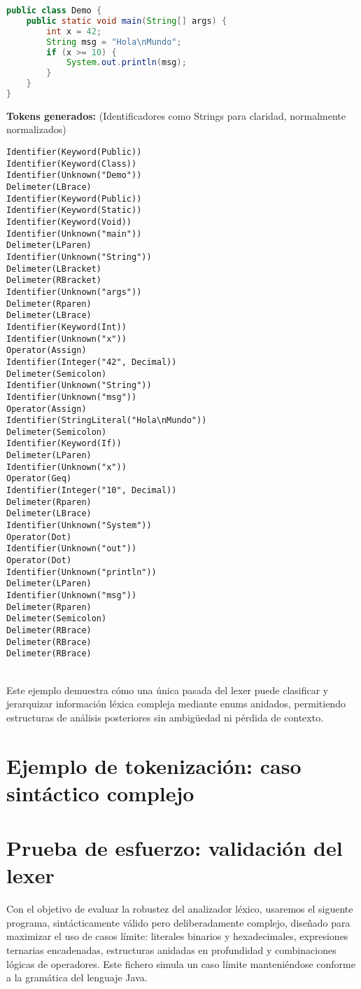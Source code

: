 \documentclass{article}
\begin{document}
\begin{lstlisting}[language=Java, caption=Demo.java - Fragmento simple con riqueza léxica]
public class Demo {
	public static void main(String[] args) {
		int x = 42;
		String msg = "Hola\nMundo";
		if (x >= 10) {
			System.out.println(msg);
		}
	}
}
\end{lstlisting}
\newpage{}
\noindent \textbf{Tokens generados:} \hfill (Identificadores como Strings para claridad, normalmente normalizados)

\begin{verbatim}
Identifier(Keyword(Public))
Identifier(Keyword(Class))
Identifier(Unknown("Demo"))
Delimeter(LBrace)
Identifier(Keyword(Public))
Identifier(Keyword(Static))
Identifier(Keyword(Void))
Identifier(Unknown("main"))
Delimeter(LParen)
Identifier(Unknown("String"))
Delimeter(LBracket)
Delimeter(RBracket)
Identifier(Unknown("args"))
Delimeter(Rparen)
Delimeter(LBrace)
Identifier(Keyword(Int))
Identifier(Unknown("x"))
Operator(Assign)
Identifier(Integer("42", Decimal))
Delimeter(Semicolon)
Identifier(Unknown("String"))
Identifier(Unknown("msg"))
Operator(Assign)
Identifier(StringLiteral("Hola\nMundo"))
Delimeter(Semicolon)
Identifier(Keyword(If))
Delimeter(LParen)
Identifier(Unknown("x"))
Operator(Geq)
Identifier(Integer("10", Decimal))
Delimeter(Rparen)
Delimeter(LBrace)
Identifier(Unknown("System"))
Operator(Dot)
Identifier(Unknown("out"))
Operator(Dot)
Identifier(Unknown("println"))
Delimeter(LParen)
Identifier(Unknown("msg"))
Delimeter(Rparen)
Delimeter(Semicolon)
Delimeter(RBrace)
Delimeter(RBrace)
Delimeter(RBrace)
\end{verbatim}
\\
Este ejemplo demuestra cómo una única pasada del lexer puede clasificar y jerarquizar información léxica compleja mediante enums anidados, permitiendo estructuras de análisis posteriores sin ambigüedad ni pérdida de contexto.

\newpage{}
\section*{Ejemplo de tokenización: caso sintáctico complejo}

\section*{Prueba de esfuerzo: validación del lexer}

Con el objetivo de evaluar la robustez del analizador léxico, usaremos el siguente programa, sintácticamente válido pero deliberadamente complejo, diseñado para maximizar el uso de casos límite: literales binarios y hexadecimales, expresiones ternarias encadenadas, estructuras anidadas en profundidad y combinaciones lógicas de operadores. Este fichero simula un caso límite manteniéndose conforme a la gramática del lenguaje Java.
\end{document}
